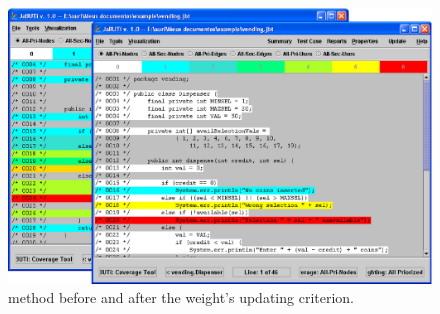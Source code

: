 \begin{figure}[!ht]
\begin{center}
\includegraphics[height=0.40\textheight]{fig/dispenser-source-edited.eps}
\caption{\label{fig:source-input1} 
method before and after the weight's updating \wrt
{} criterion.}
\end{center}
\end{figure}
